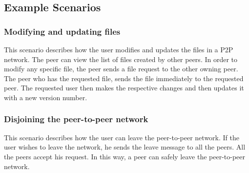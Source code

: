 
\subsection{Example Scenarios}


\subsubsection{Modifying and updating files}
This scenario describes how the user modifies and updates the files in a P2P network. The peer can view the list of files created by other peers. In order to modify any specific file, the peer sends a file request to the other owning peer. The peer who has the requested file, sends the file immediately to the requested peer. The requested user then makes the respective changes and then updates it with a new version number.  

\subsubsection{Disjoining the peer-to-peer network}
This scenario describes how the user can leave the peer-to-peer network. If the user wishes to leave the network, he sends the leave message to all the peers. All the peers accept his request. In this way, a peer can safely leave the peer-to-peer network. 
           
           
          